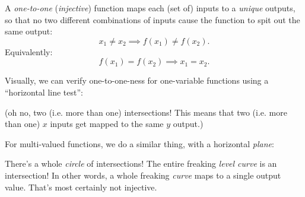 \documentclass[11pt]{article}
\begin{document}
A \emph{one-to-one} (\emph{injective}) function maps each (set of) inputs to a \emph{unique} outputs, so that no two different combinations of inputs cause the function to spit out the same output:
\[
    x_1 \ne x_2 \implies f(x_1) \ne f(x_2).
\]
Equivalently:
\[
    f(x_1) = f(x_2) \implies x_1 = x_2.
\]

Visually, we can verify one-to-one-ness for one-variable functions using a ``horizontal line test'':
\begin{center}
\end{center}
(oh no, two (i.e. more than one) intersections! This means that two (i.e. more than one) \(x\) inputs get mapped to the same \(y\) output.)

For multi-valued functions, we do a similar thing, with a horizontal \emph{plane}:

\begin{center}
\end{center}
There's a whole \emph{circle} of intersections! The entire freaking \emph{level curve} is an intersection! In other words, a whole freaking \emph{curve} maps to a single output value. That's most certainly not injective. 
\end{document}
